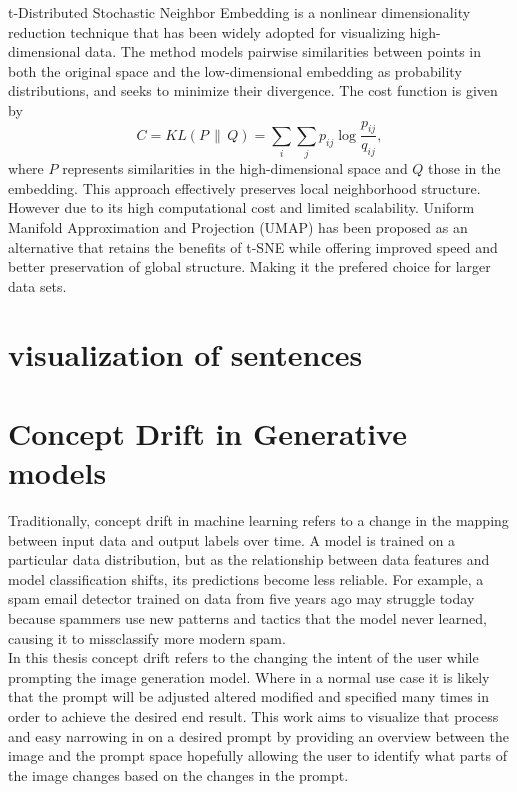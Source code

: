 \documentclass[
  a4paper,  %
  twoside,  %
  bibliography=totoc,
  headsepline,
  cleardoublepage=empty,
  parskip=half,
  draft=false
]{scrbook}
\begin{document}
t-Distributed Stochastic Neighbor Embedding \cite{van2008visualizing} is a
nonlinear dimensionality reduction technique that has been widely adopted for
visualizing high-dimensional data. The method models pairwise similarities between
points in both the original space and the low-dimensional embedding as probability
distributions, and seeks to minimize their divergence. The cost function is given by
\begin{equation}
	C = KL(P \,\|\, Q) = \sum_i \sum_j p_{ij} \log \frac{p_{ij}}{q_{ij}},
\end{equation}
where $P$ represents similarities in the high-dimensional space and $Q$ those in
the embedding. This approach effectively preserves local neighborhood structure.
However due to its high 
computational cost and limited scalability.
Uniform Manifold Approximation and Projection (UMAP) has been proposed as an
alternative that retains the benefits of t-SNE while offering improved speed and
better preservation of global structure. Making it the prefered choice for larger data sets.


\section{visualization of sentences}


\section{Concept Drift in Generative models}
Traditionally, concept drift in machine learning refers to a change in the mapping between input data and output labels over time. A model is trained on a particular data distribution, but as the relationship between data features and model classification shifts, its predictions become less reliable. For example, a spam email detector trained on data from five years ago may struggle today because spammers use new patterns and tactics that the model never learned, causing it to missclassify more modern spam.\\
In this thesis concept drift refers to the changing the intent of the user while prompting the image generation model. Where in a normal use case it is likely that the prompt will be adjusted altered modified and specified many times in order to achieve the desired end result. This work aims to visualize that process and easy narrowing in on a desired prompt by providing an overview between the image and the prompt space hopefully allowing the user to identify what parts of the image changes based on the changes in the prompt.
\end{document}
